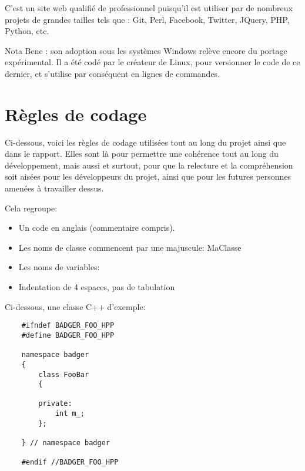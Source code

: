     C'est un site web qualifié de professionnel puisqu'il est utiliser par de 
    nombreux projets de grandes tailles tels que : Git, Perl, Facebook, Twitter,
    JQuery, PHP, Python, etc.

    Nota Bene : son adoption sous les systèmes Windows relève encore du portage
    expérimental. Il a été codé par le créateur de Linux, pour versionner le code
    de ce dernier, et s'utilise par conséquent en lignes de commandes.







    \section{Règles de codage}
        Ci-dessous, voici les règles de codage utilisées tout au long du projet
    ainsi que dans le rapport. Elles sont là pour permettre une cohérence tout au
    long du développement, mais aussi et surtout, pour que la relecture et la 
    compréhension soit aisées pour les développeurs du projet, ainsi que pour les
    futures personnes amenées à travailler dessus.

    Cela regroupe:
    \begin{itemize}
    \item Un code en anglais (commentaire compris).
    \item Les noms de classe commencent par une majuscule: MaClasse
    \item Les noms de variables: 
    \item Indentation de 4 espaces, pas de tabulation
    \end{itemize}

    Ci-dessous, une classe C++ d'exemple:

    \begin{lstlisting}
    #ifndef BADGER_FOO_HPP
    #define BADGER_FOO_HPP

    namespace badger
    {
        class FooBar
        {

        private:
            int m_;
        };

    } // namespace badger

    #endif //BADGER_FOO_HPP
    \end{lstlisting}




